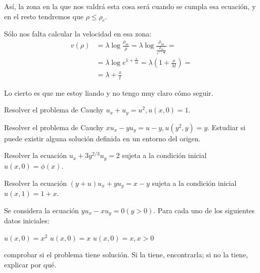 \begin{problem}[4]
	Así, la zona en la que nos valdrá esta cosa será cuando se cumpla esa ecuación, y en el resto tendremos que $ρ ≤ ρ_c$.

	Sólo nos falta calcular la velocidad en esa zona: \begin{align*}
	v(ρ) &= λ \log \frac{ρ_m}{ρ} = λ \log \frac{ρ_m}{\frac{ρ_m}{e^{1 + \frac{x}{λt}}}} = \\
	&= λ \log e^{1 + \frac{x}{λt}} = λ(1 + \frac{x}{λt}) = \\
	&= λ + \frac{x}{t}
	\end{align*}


	Lo cierto es que me estoy liando y no tengo muy claro cómo seguir.

	\spart


\end{problem}

\begin{problem}[5]
	Resolver el problema de Cauchy $u_x + u_y = u^2, u(x,0) = 1$.

	\solution
\end{problem}

\begin{problem}[6]
	Resolver el problema de Cauchy $xu_x - yu_y = u - y, u(y^2,y)=y$. Estudiar si puede existir alguna solución definida en un entorno del origen.

	\solution
\end{problem}

\begin{problem}[7]
	Resolver la ecuación $u_x + 3y^{2/3} u_y = 2$ sujeta a la condición inicial $u(x,0) = \phi(x)$.

	\solution
\end{problem}

\begin{problem}[8]
	Resolver la ecuación $(y + u)u_x + yu_y = x - y$ sujeta a la condición inicial $u(x,1) = 1 + x$.

	\solution
\end{problem}

\begin{problem}[9]
	Se considera la ecuación $yu_x - xu_y = 0 (y > 0)$. Para cada uno de los siguientes datos iniciales:

	\ppart $u(x, 0) = x^{2}$
	\ppart $u(x,0) = x$
	\ppart $u(x,0) = x, x > 0$

	comprobar si el problema tiene solución. Si la tiene, encontrarla; si no la tiene, explicar por qué.

	\solution

	\spart
	\spart
	\spart
\end{problem}


